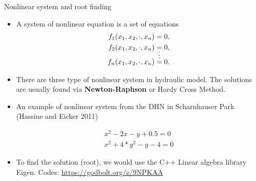 \documentclass[xcolor=dvipsnames]{beamer}
\begin{document}
\begin{frame}[shrink=20]{Nonlinear system and root finding}

\begin{itemize}
	\item A system of nonlinear equation is a set of equations 
	\begin{align*}
		f_1(x_1,x_2,\cdot,x_n)&=0,\\
		f_2(x_1,x_2,\cdot,x_n)&=0,\\
		&\shortvdotswithin{=}
		f_n(x_1,x_2,\cdot,x_n)&=0.
	\end{align*}
	\item There are three type of nonlinear system in hydraulic model. The solutions are usually found via 
	\textbf{Newton-Raphson} or Hardy Cross Method.

	\item An example of nonlinear system from the DHN in Scharnhauser Park (Hassine and Eicker 2011)

	\begin{align*}
		x^2-2x-y+0.5=0\\
		x^2+4*y^2-y-4=0
	\end{align*}

	\item To find the solution (root), we would use the C++ Linear algebra library {\color{purple}Eigen}.  %
	Codes: \url{https://godbolt.org/z/9NPKAA}

\end{itemize}
\end{frame}
\end{document}
